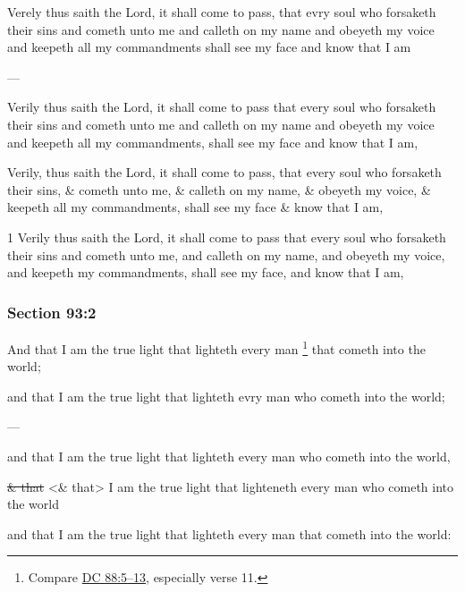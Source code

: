 		\begin{framed}
		\scriptsize
			\begin{compactdesc}
				\item[JSP] Verely thus saith the Lord, it shall come to pass, that evry soul who forsaketh their sins and cometh unto me and calleth on my name and obeyeth my voice and keepeth all my commandments shall see my face and know that I am
				\item[BC] ---
				\item[RB2] Verily thus saith the Lord, it shall come to pass that every soul who forsaketh their sins and cometh unto me and calleth on my name and obeyeth my voice and keepeth all my commandments, shall see my face and know that I am, 
				\item[RB1] Verily, thus saith the Lord, it shall come to pass, that every soul who forsaketh their sins, \& cometh unto me, \& calleth on my name, \& obeyeth my voice, \& keepeth all my commandments, shall see my face \& know that I am, 
				\item[DC 1835] 1 Verily thus saith the Lord, it shall come to pass that every soul who forsaketh their sins and cometh unto me, and calleth on my name, and obeyeth my voice, and keepeth my commandments, shall see my face, and know that I am, 
			\end{compactdesc}
		\end{framed}

	\subsubsection{Section 93:2} %
		\label{DC93-2}

		And that I am the true light that lighteth every man%
		\footnote{%
			Compare \hyperref[DC88-5]{DC 88:5--13}, especially verse 11.
			} 
		that cometh into the world;

		\begin{framed}
		\scriptsize
			\begin{compactdesc}
				\item[JSP] and that I am the true light that lighteth evry man who cometh into the world;
				\item[BC] ---
				\item[RB2] and that I am the true light that lighteth every man who cometh into the world, 
				\item[RB1] \sout{\& that} <\& that> I am the true light that lighteneth every man who cometh into the world 
				\item[DC 1835] and that I am the true light that lighteth every man that cometh into the world: 
			\end{compactdesc}
		\end{framed}

